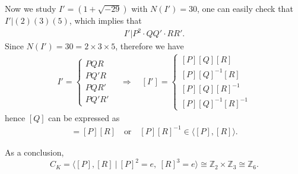 \begin{example}
\medskip
Now we study \(I' = (1+\sqrt{-29})\) with \(N(I') = 30\), one can easily check that \(I' | (2)(3)(5)\), which implies that 
\begin{align*}
    I' | P^2\cdot Q Q'  \cdot RR'.
\end{align*}
Since \(N(I') = 30 = 2\times3 \times 5\), therefore we have
\begin{align*}
    I' = \left\{\begin{matrix}
PQR \\
PQ'R \\
PQR' \\
PQ'R'
\end{matrix}\right. \quad \Rightarrow \quad [I'] = \left\{\begin{matrix}
[P][Q][R] \\
[P][Q]^{-1}[R] \\
[P][Q][R]^{-1} \\
[P][Q]^{-1}[R]^{-1}
\end{matrix}\right.
\end{align*}
hence \([Q]\) can be expressed as
\begin{align*}
    [Q] =  [P][R] \quad \text{or}\quad [P][R]^{-1} \in \langle[P],[R]\rangle.
\end{align*}

As a conclusion, 
\[C_K = \langle [P],[R]\ |\ [P]^2 = e,\ [R]^3 = e \rangle \cong \mathbb{Z}_2 \times \mathbb{Z}_3 \cong \mathbb{Z}_6.\]
\end{example}


